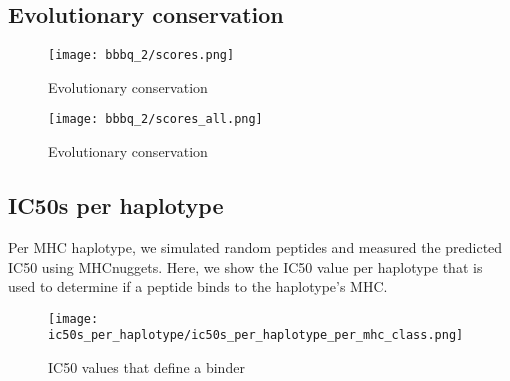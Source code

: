 \subsection{Evolutionary conservation}

\begin{figure}[!htbp]
  \texttt{[image: bbbq\_2/scores.png]}
  \caption{
    Evolutionary conservation
  }
  \label{fig:evolutionary_conservation_tmh}
\end{figure}

\begin{figure}[!htbp]
  \texttt{[image: bbbq\_2/scores\_all.png]}
  \caption{
    Evolutionary conservation
  }
  \label{fig:evolutionary_conservation_all}
\end{figure}

\subsection{IC50s per haplotype}
\label{subsec:ic50s_per_haplotype}

Per MHC haplotype, we simulated random peptides and measured the
predicted IC50 using MHCnuggets. 
Here, we show the IC50 value per haplotype that
is used to determine if a peptide binds to the haplotype's MHC.

% 

\begin{figure}[!htbp]
  \texttt{[image: ic50s\_per\_haplotype/ic50s\_per\_haplotype\_per\_mhc\_class.png]}
  \caption{
    IC50 values that define a binder
  }
  \label{fig:ic50s_per_haplotype}
\end{figure}






